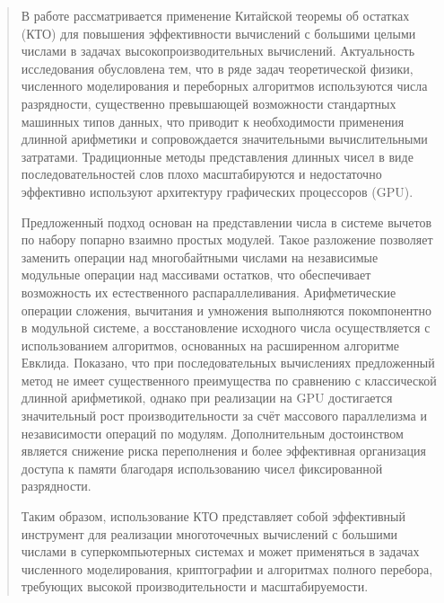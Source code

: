 \documentclass{crm-article}
\begin{document}
\author[1,2]{~}

\author[1,2]{~}

\begin{abstract}
В работе рассматривается применение Китайской теоремы об остатках (КТО) для повышения эффективности вычислений с большими целыми числами в задачах высокопроизводительных вычислений. Актуальность исследования обусловлена тем, что в ряде задач теоретической физики, численного моделирования и переборных алгоритмов используются числа разрядности, существенно превышающей возможности стандартных машинных типов данных, что приводит к необходимости применения длинной арифметики и сопровождается значительными вычислительными затратами. Традиционные методы представления длинных чисел в виде последовательностей слов плохо масштабируются и недостаточно эффективно используют архитектуру графических процессоров (GPU).

Предложенный подход основан на представлении числа в системе вычетов по набору попарно взаимно простых модулей. Такое разложение позволяет заменить операции над многобайтными числами на независимые модульные операции над массивами остатков, что обеспечивает возможность их естественного распараллеливания. Арифметические операции сложения, вычитания и умножения выполняются покомпонентно в модульной системе, а восстановление исходного числа осуществляется с использованием алгоритмов, основанных на расширенном алгоритме Евклида. Показано, что при последовательных вычислениях предложенный метод не имеет существенного преимущества по сравнению с классической длинной арифметикой, однако при реализации на GPU достигается значительный рост производительности за счёт массового параллелизма и независимости операций по модулям. Дополнительным достоинством является снижение риска переполнения и более эффективная организация доступа к памяти благодаря использованию чисел фиксированной разрядности.

Таким образом, использование КТО представляет собой эффективный инструмент для реализации многоточечных вычислений с большими числами в суперкомпьютерных системах и может применяться в задачах численного моделирования, криптографии и алгоритмах полного перебора, требующих высокой производительности и масштабируемости.
\end{abstract}
\end{document}
